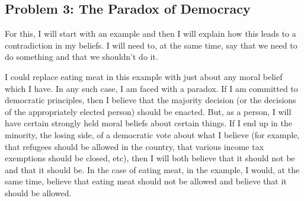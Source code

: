 \subsection{Problem 3: The Paradox of Democracy}

For this, I will start with an example and then I will explain how this leads to a contradiction in my beliefs. I will need to, at the same time, say that we need to do something and that we shouldn't do it.


I could replace eating meat in this example with just about any moral belief which I have. In any such case, I am faced with a paradox. If I am committed to democratic principles, then I believe that the majority decision (or the decisions of the appropriately elected person) should be enacted. But, as a person, I will have certain strongly held moral beliefs about certain things. If I end up in the minority, the losing side, of a democratic vote about what I believe (for example, that refugees should be allowed in the country, that various income tax exemptions should be closed, etc), then I will both believe that it should not be and that it should be. In the case of eating meat, in the example, I would, at the same time, believe that eating meat should not be allowed and believe that it should be allowed. 